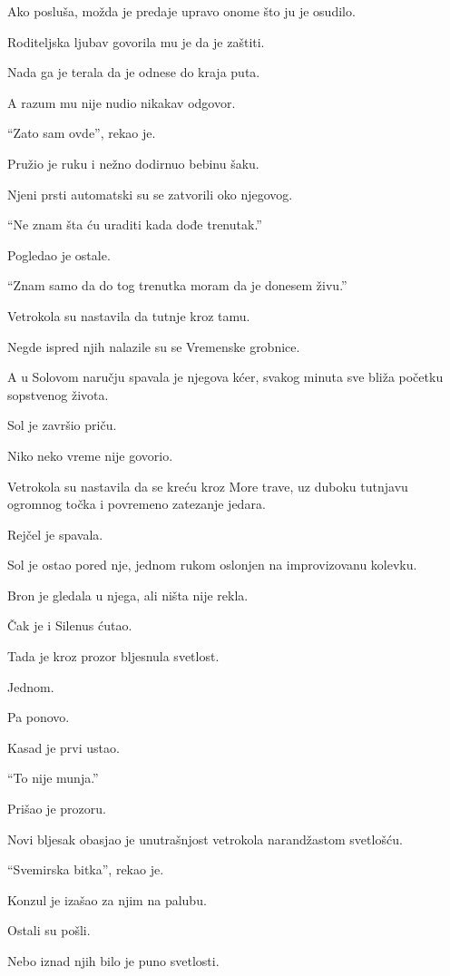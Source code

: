 Ako posluša, možda je predaje upravo onome što ju je osudilo.

Roditeljska ljubav govorila mu je da je zaštiti.

Nada ga je terala da je odnese do kraja puta.

A razum mu nije nudio nikakav odgovor.

``Zato sam ovde'', rekao je.

Pružio je ruku i nežno dodirnuo bebinu šaku.

Njeni prsti automatski su se zatvorili oko njegovog.

``Ne znam šta ću uraditi kada dođe trenutak.''

Pogledao je ostale.

``Znam samo da do tog trenutka moram da je donesem živu.''

Vetrokola su nastavila da tutnje kroz tamu.

Negde ispred njih nalazile su se Vremenske grobnice.

A u Solovom naručju spavala je njegova kćer, svakog minuta sve bliža početku sopstvenog života.

\bigskip

Sol je završio priču.

Niko neko vreme nije govorio.

Vetrokola su nastavila da se kreću kroz More trave, uz duboku tutnjavu ogromnog točka i povremeno zatezanje jedara.

Rejčel je spavala.

Sol je ostao pored nje, jednom rukom oslonjen na improvizovanu kolevku.

Bron je gledala u njega, ali ništa nije rekla.

Čak je i Silenus ćutao.

Tada je kroz prozor bljesnula svetlost.

Jednom.

Pa ponovo.

Kasad je prvi ustao.

``To nije munja.''

Prišao je prozoru.

Novi bljesak obasjao je unutrašnjost vetrokola narandžastom svetlošću.

``Svemirska bitka'', rekao je.

Konzul je izašao za njim na palubu.

Ostali su pošli.

\bigskip

Nebo iznad njih bilo je puno svetlosti.

